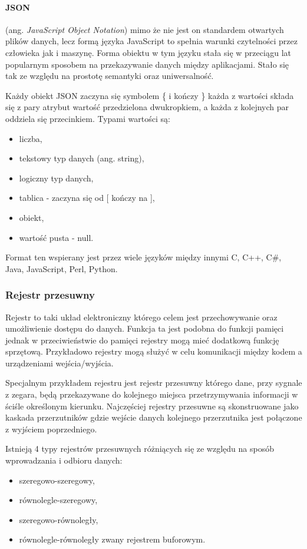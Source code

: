 \paragraph{JSON }
(ang. \textit{JavaScript Object Notation}) mimo że nie jest on standardem otwartych plików danych, lecz formą języka JavaScript to spełnia warunki czytelności przez człowieka jak i maszynę. 
Forma obiektu w tym języku stała się w przeciągu lat popularnym sposobem na przekazywanie danych między aplikacjami. Stało się tak ze względu na prostotę semantyki oraz uniwersalność. 

Każdy obiekt JSON zaczyna się symbolem \{ i kończy \} każda z wartości składa się z pary atrybut wartość przedzielona dwukropkiem, a każda z kolejnych par oddziela się przecinkiem. Typami wartości są:
\begin{itemize}
        \item liczba, 
        \item tekstowy typ danych (ang. string),
        \item logiczny typ danych,
        \item tablica - zaczyna się od [ kończy na ],
        \item obiekt,
        \item wartość pusta - null. 
\end{itemize}

Format ten wspierany jest przez wiele języków między innymi C, C++, C\#, Java, JavaScript, Perl, Python\cite{json}.

\subsubsection{Rejestr przesuwny}
Rejestr to taki układ elektroniczny którego celem jest przechowywanie oraz umożliwienie dostępu do danych. Funkcja ta jest podobna do funkcji pamięci jednak w przeciwieństwie do pamięci rejestry mogą mieć dodatkową funkcję sprzętową.
Przykładowo rejestry mogą służyć w celu komunikacji między kodem a urządzeniami wejścia/wyjścia.

Specjalnym przykładem rejestru jest rejestr przesuwny którego dane, przy sygnale z zegara, będą przekazywane do kolejnego miejsca przetrzymywania informacji w ściśle określonym kierunku.  
Najczęściej rejestry przesuwne są skonstruowane jako kaskada przerzutników gdzie wejście danych kolejnego przerzutnika jest połączone z wyjściem poprzedniego.

Istnieją 4 typy rejestrów przesuwnych różniących się ze względu na sposób wprowadzania i odbioru danych:
\begin{itemize}
        \item szeregowo-szeregowy,
        \item równolegle-szeregowy,
        \item szeregowo-równoległy,
        \item równolegle-równoległy zwany rejestrem buforowym.
\end{itemize} 
